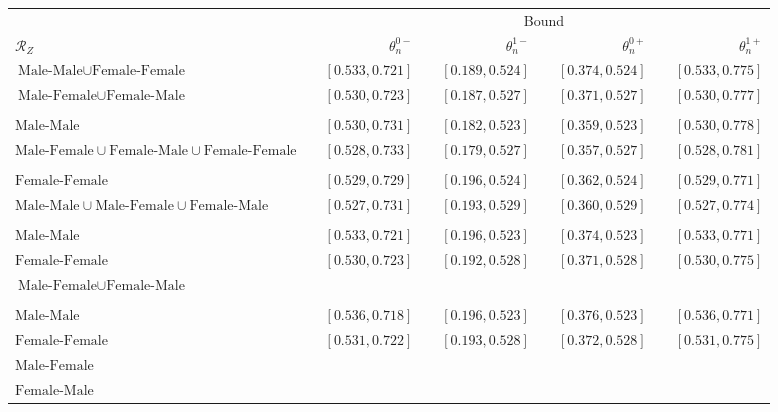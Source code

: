 \documentclass[class=article,border = 0pt,crop]{standalone}
\begin{document}
\centering
\begin{tabular}{lcrcrcrcr}
\toprule
&	& \multicolumn{7}{c}{Bound} \\
\cmidrule(r){2-9}	
	$\mathcal{R}_Z$	&	&	$\theta_{n}^{0-}$	&	&	$\theta_n^{1-}$	&	&	$\theta_{n}^{0+}$	&	&	$\theta_n^{1+}$\\
\midrule
$\text{Male-Male}\cup\text{Female-Female}$	&	&	$[0.533,0.721]$	&	&	$[0.189,0.524]$	&	&	$[0.374,0.524]$	&	&	$[0.533,0.775]$
\\
$\text{Male-Female}\cup\text{Female-Male}$	&	&	\color{blue}$[0.530,0.723]$	&	&	\color{blue}$[0.187,0.527]$	&	&	\color{blue}$[0.371,0.527]$	&	&	\color{blue}$[0.530,0.777]$\\
\\
$\text{Male-Male}$	&	&	$[0.530,0.731]$	&	&	$[0.182,0.523]$	&	&	$[0.359,0.523]$	&	&	$[0.530,0.778]$
\\
$\text{Male-Female}\cup\text{Female-Male}\cup\text{Female-Female}$	&	&	\color{blue}$[0.528,0.733]$	&	&	\color{blue}$[0.179,0.527]$	&	&	\color{blue}$[0.357,0.527]$	&	&	\color{blue}$[0.528,0.781]$\\
\\
$\text{Female-Female}$	&	&	$[0.529,0.729]$	&	&	$[0.196,0.524]$	&	&	$[0.362,0.524]$	&	&	$[0.529,0.771]$
\\
$\text{Male-Male}\cup\text{Male-Female}\cup\text{Female-Male}$	& &\color{blue}$[0.527,0.731]$	&	&	\color{blue}$[0.193,0.529]$	&	&	\color{blue}$[0.360,0.529]$	&	&	\color{blue}$[0.527,0.774]$\\	
\\
$\text{Male-Male}$&	&	$[0.533,0.721]$	&	&	$[0.196,0.523]$	&	&	$[0.374,0.523]$	&	&	$[0.533,0.771]$
\\
$\text{Female-Female}$ & &\color{blue}$[0.530,0.723]$	&	&	\color{blue}$[0.192,0.528]$	&	&	\color{blue}$[0.371,0.528]$	&	&	\color{blue}$[0.530,0.775]$\\
$\text{Male-Female}\cup\text{Female-Male}$\\	
\\
$\text{Male-Male}$&	&	$[0.536,0.718]$	&	&	$[0.196,0.523]$	&	&	$[0.376,0.523]$	&	&	$[0.536,0.771]$
\\
$\text{Female-Female}$& &\color{blue}$[0.531,0.722]$	&	&	\color{blue}$[0.193,0.528]$	&	&	\color{blue}$[0.372,0.528]$	&	&	\color{blue}$[0.531,0.775]$\\
$\text{Male-Female}$ \\
$\text{Female-Male}$\\	

\end{tabular}
\end{document}
